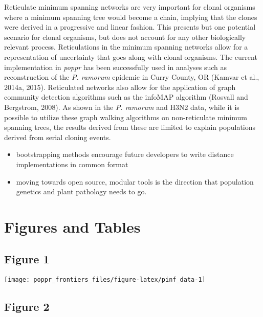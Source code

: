 \documentclass{frontiersSCNS} %
\newenvironment{CodeChunk}{}{}
\begin{document}
Reticulate minimum spanning networks are very important for clonal
organisms where a minimum spanning tree would become a chain, implying
that the clones were derived in a progressive and linear fashion. This
presents but one potential scenario for clonal organisms, but does not
account for any other biologically relevant process. Reticulations in
the minimum spanning networks allow for a representation of uncertainty
that goes along with clonal organisms. The current implementation in
\emph{poppr} has been successfully used in analyses such as
reconstruction of the \emph{P. ramorum} epidemic in Curry County, OR
(Kamvar et al., 2014a, 2015). Reticulated networks also allow for the
application of graph community detection algorithms such as the infoMAP
algorithm (Rosvall and Bergstrom, 2008). As shown in the \emph{P.
ramorum} and H3N2 data, while it is possible to utilize these graph
walking algorithms on non-reticulate minimum spanning trees, the results
derived from these are limited to explain populations derived from
serial cloning events.

\begin{itemize}
\itemsep1pt\parskip0pt
\item
  bootstrapping methods encourage future developers to write distance
  implementations in common format
\item
  moving towards open source, modular tools is the direction that
  population genetics and plant pathology needs to go.
\end{itemize}

\section*{Figures and Tables}\label{figures-and-tables}

\subsection*{Figure 1}\label{figure-1}

\begin{CodeChunk}

\texttt{[image: poppr\_frontiers\_files/figure-latex/pinf\_data-1]} \end{CodeChunk}

\subsection*{Figure 2}\label{figure-2}
\end{document}

